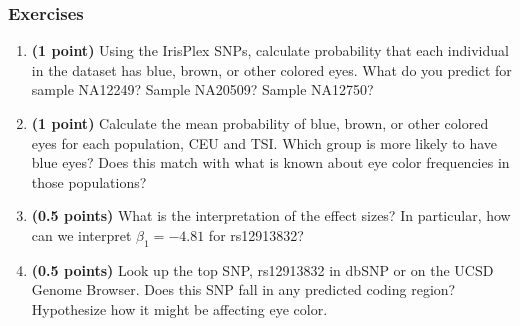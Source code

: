 \documentclass[12pt]{article}
\begin{document}
\subsubsection*{Exercises}
\begin{enumerate}

\item \textbf{(1 point)} Using the IrisPlex SNPs, calculate probability that each individual in the dataset has blue, brown, or other colored eyes. What do you predict for sample NA12249? Sample NA20509? Sample NA12750?

\item \textbf{(1 point)} Calculate the mean probability of blue, brown, or other colored eyes for each population, CEU and TSI. Which group is more likely to have blue eyes? Does this match with what is known about eye color frequencies in those populations?

\item \textbf{(0.5 points)} What is the interpretation of the effect sizes? In particular, how can we interpret $\beta_1=-4.81$ for rs12913832?

\item \textbf{(0.5 points)} Look up the top SNP, rs12913832 in dbSNP or on the UCSD Genome Browser. Does this SNP fall in any predicted coding region? Hypothesize how it might be affecting eye color.
\end{enumerate}
\end{document}
